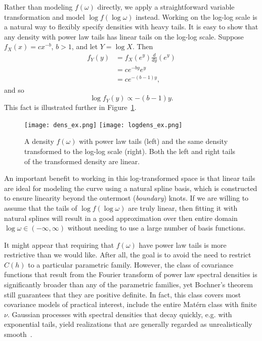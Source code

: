 Rather than modeling $f(\omega)$ directly, we apply a straightforward variable transformation and model $\log f(\log \omega)$ instead. Working on the log-log scale is a natural way to flexibly specify densities with heavy tails.  It is easy to show that any density with power law tails has linear tails on the log-log scale. Suppose $f_X(x) = cx^{-b}$, $b > 1$, and let $Y = \log X$. Then
\begin{align*}
	f_Y(y) &= f_X(e^y) \frac{d}{dy}(e^y) \\
	&= ce^{-by}e^y \\
	&= ce^{-(b-1)y},
\end{align*}
and so
\[
	\log f_Y(y) \propto -(b-1)y.
\]
This fact is illustrated further in Figure~\ref{fig:logdens_ex}.

\begin{figure}[!htb]
	\centering
	\texttt{[image: dens\_ex.png]}
	\texttt{[image: logdens\_ex.png]}
	\caption{\small A density $f(\omega)$ with power law tails (left) and the same density transformed to the log-log scale (right). Both the left and right tails of the transformed density are linear.}
	\label{fig:logdens_ex}
\end{figure}

An important benefit to working in this log-transformed space is that linear tails are ideal for modeling the curve using a natural spline basis, which is constructed to ensure linearity beyond the outermost (\emph{boundary}) knots. If we are willing to assume that the tails of $\log f(\log \omega)$ are truly linear, then fitting it with natural splines will result in a good approximation over then entire domain $\log \omega \in (-\infty, \infty)$ without needing to use a large number of basis functions.

It might appear that requiring that $f(\omega)$ have power law tails is more restrictive than we would like. After all, the goal is to avoid the need to restrict $C(h)$ to a particular parametric family. However, the class of covariance functions that result from the Fourier transform of power law spectral densities is significantly broader than any of the parametric families, yet Bochner's theorem still guarantees that they are positive definite. In fact, this class covers most covariance models of practical interest, include the entire Mat\'ern class with finite $\nu$. Gaussian processes with spectral densities that decay quickly, e.g. with exponential tails, yield realizations that are generally regarded as unrealistically smooth~\cite{Stein1999}. %

